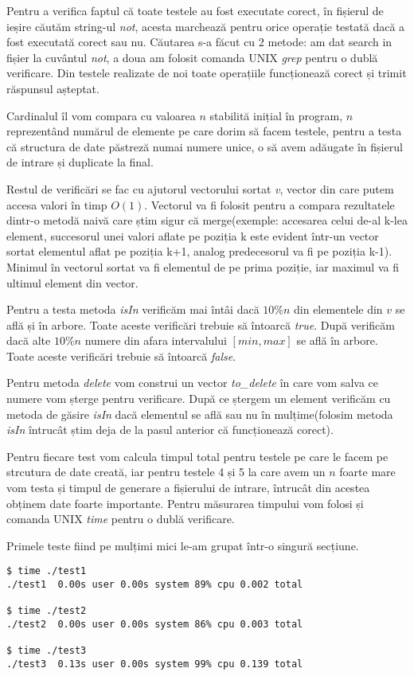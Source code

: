 \documentclass[]{report}
\begin{document}
	Pentru a verifica faptul că toate testele au fost executate corect, în
	fișierul de ieșire căutăm string-ul \emph{not}, acesta marchează pentru orice
	operație testată dacă a fost executată corect sau nu. Căutarea s-a făcut cu
	2 metode: am dat search in fișier la cuvântul \emph{not}, a doua am folosit 
	comanda UNIX \emph{grep} pentru o dublă verificare. Din testele realizate 
	de noi toate operațiile funcționează corect și trimit răspunsul așteptat.

	Cardinalul îl vom compara cu valoarea $n$ stabilită inițial în program, $n$
	reprezentând numărul de elemente pe care dorim să facem testele, pentru a 
	testa că structura de date păstreză numai numere unice, o să avem adăugate
	în fișierul de intrare și duplicate la final.
	
	Restul de verificări se fac cu ajutorul vectorului sortat \emph{v}, vector 
	din care putem accesa valori în timp $O(1)$. Vectorul va fi folosit pentru a
	compara	rezultatele dintr-o metodă naivă care știm sigur că merge(exemple: 
	accesarea celui de-al k-lea element, succesorul unei valori aflate pe 
	poziția k este evident într-un vector sortat elementul aflat pe poziția k+1,
	analog predecesorul va fi pe poziția k-1). Minimul în vectorul sortat va fi
	elementul de pe prima poziție, iar maximul va fi ultimul element din vector.

	Pentru a testa metoda \emph{isIn} verificăm mai întâi dacă $10\%n$ din
	elementele din $v$ se află și în arbore. Toate aceste verificări trebuie să
	întoarcă \emph{true}. După verificăm dacă alte $10\%n$ numere din afara
	intervalului $[min, max]$ se află în arbore. Toate aceste verificări trebuie
	să întoarcă \emph{false}.
	
	Pentru metoda \emph{delete} vom construi un vector \emph{to\_delete} în care
	vom salva ce numere vom șterge pentru verificare. După ce ștergem un element
	verificăm cu metoda de găsire \emph{isIn} dacă elementul se află sau nu în 
	mulțime(folosim metoda \emph{isIn} întrucât știm deja de la pasul anterior
	că funcționează corect).

	Pentru fiecare test vom calcula timpul total pentru testele pe care le facem
	pe strcutura de date creată, iar pentru testele 4 și 5 la care avem un $n$
	foarte mare vom testa și timpul de generare a fișierului de intrare, întrucât
	din acestea obținem date foarte importante. Pentru măsurarea timpului vom
	folosi și comanda UNIX \emph{time} pentru o dublă verificare.

	Primele teste fiind pe mulțimi mici le-am grupat într-o singură secțiune.
	\begin{lstlisting}
$ time ./test1
./test1  0.00s user 0.00s system 89% cpu 0.002 total

$ time ./test2
./test2  0.00s user 0.00s system 86% cpu 0.003 total

$ time ./test3
./test3  0.13s user 0.00s system 99% cpu 0.139 total
	\end{lstlisting}
\end{document}
